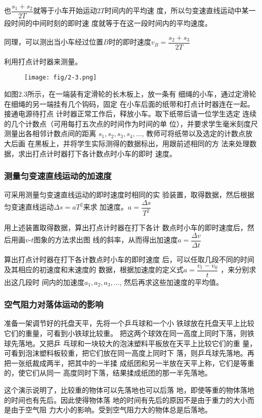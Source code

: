 也$\dfrac{s_1+s_2}{2T}$就等于小车开始运动$2T$时间内的平均速
度，所以匀变速直线运动中某一段时间的中间时刻的即时速
度就等于在这一段时间内的平均速度。

同理，可以测出当小车经过位置$B$时的即时速度$v_B=\dfrac{s_2+s_3}{2T}$

利用打点计时器来测量。
\begin{figure}[htp]
    \centering
\texttt{[image: fig/2-3.png]}
    \caption{}
\end{figure}
如图2.3所示，在一端装有定滑轮的长木板上，放一条有
细绳的小车，通过定滑轮在细绳的另一端挂有几个钩码，固定
在小车后面的纸带和打点计时器连在一起。接通电源待打点
计时器正常工作后，释放小车。取下纸带后请一位学生选定
连续的几个计数点（可用每打五次点的时间作为时间的单
位），并要求学生毫米刻度尺测量出各相邻计数点间的距离
$s_1,s_2,s_3,s_4,\ldots$, 教师可将纸带以及选定的计数点放大后画
在黑板上，并将学生实际测得的数据标出，用跟前述相同的方
法来处理数据，求出打点计时器打下各计数点时小车的即时
速度。

\subsubsection{测量匀变速直线运动的加速度}
可采用测量匀变速直线运动的即时速度时相同的实
验装置，取得数据，然后根据匀变速直线运动$\Delta s=aT^2$来求
加速度。$a=\dfrac{\Delta s}{T^2}$

用上述装置取得数据，算出打点计时器在打下各计
数点时小车的即时速度后，然后用画$v$-$t$图象的方法求出图
线的斜率，从而得出加速度$a=\dfrac{\Delta v}{\Delta t}$

算出打点计时器在打下各计数点时小车的即时速度
后，可以任取几段不同的时间及其相应的初速度和末速度的
数据，根据加速度的定义式$a=\dfrac{v_t-v_0}{t}$
，来分别求出这几段时
间内的加速度$a_1,a_2,a_3,\ldots$, 然后再求这些加速度的平均值。

\subsubsection{空气阻力对落体运动的影响}
准备一架调节好的托盘天平，先将一个乒乓球和一个小
铁球放在托盘天平上比较它们的重量，可看到小铁球比较重。
把这两个球效在同一高度上同时下落，则铁球先落地。又把乒
乓球和一块较大的泡沫塑料平板放在天平上比较它们的重
量，可看到泡沫塑料板较重，把它们放在同一高度上同时下
落，则乒乓球先落地。再把一张纸裁成两半，把其中的一半揉
成纸团和另一半放在天平上称，它们是等重的，使它们从同一
高度同时下落，结果揉成纸团的那一半先落地。

这个演示说明了，比较重的物体可以先落地也可以后落
地，即使等重的物体落地的时间也有先后。因此使得物体落
地的时间有先后的原因不是由于重力的大小而是由于空气阻
力大小的影响。受到空气阻力大的物体总是后落地。

